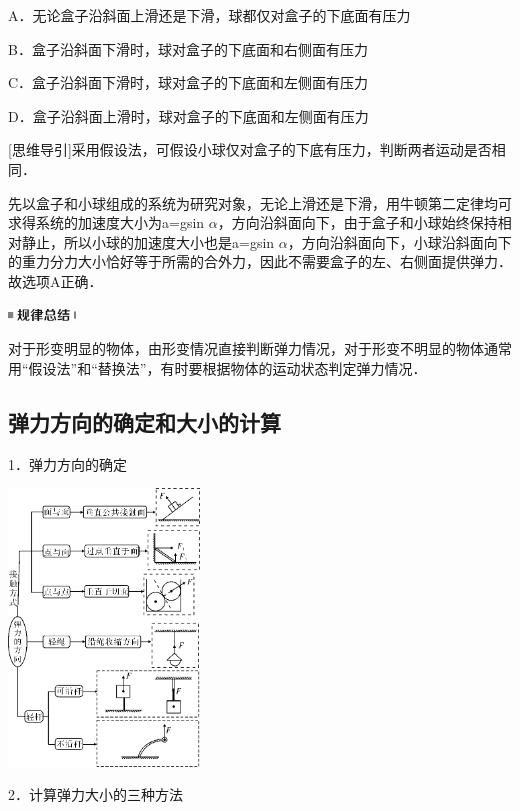 \documentclass[cn,10.5pt,chinese,mac,chinesefont=founder]{elegantbook}
\begin{document}
A．无论盒子沿斜面上滑还是下滑，球都仅对盒子的下底面有压力

B．盒子沿斜面下滑时，球对盒子的下底面和右侧面有压力

C．盒子沿斜面下滑时，球对盒子的下底面和左侧面有压力

D．盒子沿斜面上滑时，球对盒子的下底面和左侧面有压力

{[}思维导引{]}采用假设法，可假设小球仅对盒子的下底有压力，判断两者运动是否相同．
\begin{solution}
	先以盒子和小球组成的系统为研究对象，无论上滑还是下滑，用牛顿第二定律均可求得系统的加速度大小为a=gsin
$\alpha$，方向沿斜面向下，由于盒子和小球始终保持相对静止，所以小球的加速度大小也是a=gsin
$\alpha$，方向沿斜面向下，小球沿斜面向下的重力分力大小恰好等于所需的合外力，因此不需要盒子的左、右侧面提供弹力．故选项A正确．
\end{solution}

\begin{center}\includegraphics[width=0.70833in,height=0.125in]{media/image44.png}\end{center}
对于形变明显的物体，由形变情况直接判断弹力情况，对于形变不明显的物体通常用``假设法''和``替换法''，有时要根据物体的运动状态判定弹力情况．

\subsection{弹力方向的确定和大小的计算}

1．弹力方向的确定

\begin{center}\includegraphics[width=2in]{media/image45.png}\end{center}
2．计算弹力大小的三种方法
\end{document}
